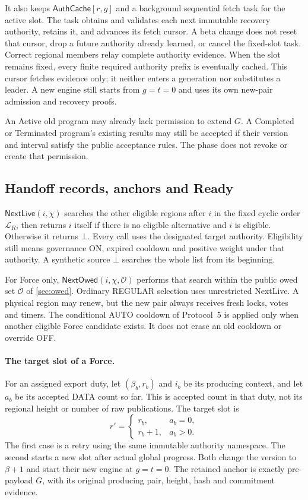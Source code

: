 \documentclass[11pt,a4paper]{article}
\newcommand{\tagg}[1]{\ensuremath{\mathsf{#1}}}
\begin{document}
It also keeps $\tagg{AuthCache}[r,g]$ and a background sequential fetch
task for the active slot. The task obtains and validates each next
immutable recovery authority, retains it, and advances its fetch cursor.
A beta change does not reset that cursor, drop a future authority
already learned, or cancel the fixed-slot task. Correct regional
members relay complete authority evidence. When the slot remains
fixed, every finite required authority prefix is eventually cached.
This cursor fetches evidence only; it neither enters a generation nor
substitutes a leader. A new engine still starts from $g=t=0$ and uses
its own new-pair admission and recovery proofs.

An Active old program may already lack permission to extend $G$.
A Completed or Terminated program's existing results may still be
accepted if their version and interval satisfy the public acceptance
rules. The phase does not revoke or create that permission.

\subsection{Handoff records, anchors and Ready}
\label{sec:witness}
$\tagg{NextLive}(i,\chi)$ searches the other eligible regions after $i$
in the fixed cyclic order $\mathcal L_R$, then returns $i$ itself if
there is no eligible alternative and $i$ is eligible. Otherwise it
returns $\bot$. Every call uses the designated target authority.
Eligibility still means governance ON, expired cooldown and positive
weight under that authority. A synthetic source $\bot$ searches the
whole list from its beginning.

For Force only, $\tagg{NextOwed}(i,\chi,\mathcal O)$ performs that search
within the public owed set $\mathcal O$ of \cref{sec:owed}. Ordinary
REGULAR selection uses unrestricted NextLive. A physical region may
renew, but the new pair always receives fresh locks, votes and timers.
The conditional AUTO cooldown of Protocol~5 is applied only when another
eligible Force candidate exists. It does not erase an old cooldown or
override OFF.

\paragraph{The target slot of a Force.}
\label{sec:retry-slot}
For an assigned export duty, let $(\beta_b,r_b)$ and $i_b$ be its
producing context, and let $a_b$ be its accepted DATA count so far.
This is accepted count in that duty, not its regional height or number
of raw publications. The target slot is
\[
 r'=
 \begin{cases}
 r_b,&a_b=0,\\
 r_b+1,&a_b>0.
 \end{cases}
\]
The first case is a retry using the same immutable authority namespace.
The second starts a new slot after actual global progress. Both change
the version to $\beta+1$ and start their new engine at $g=t=0$.
The retained anchor is exactly pre-payload $G$, with its original
producing pair, height, hash and commitment evidence.
\end{document}
